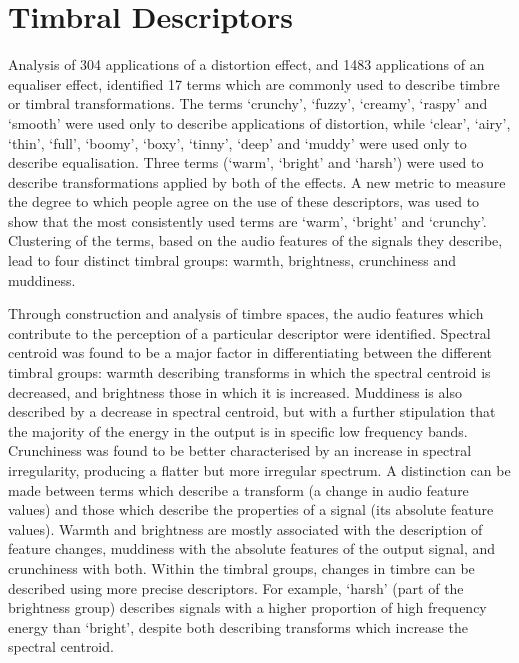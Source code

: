 \section{Timbral Descriptors}
\label{sec:Conclusion-Descriptors}
	Analysis of 304 applications of a distortion effect, and 1483 applications of an equaliser effect, identified 17
	terms which are commonly used to describe timbre or timbral transformations. The terms `crunchy', `fuzzy', `creamy',
	`raspy' and `smooth' were used only to describe applications of distortion, while `clear', `airy', `thin', `full',
	`boomy', `boxy', `tinny', `deep' and `muddy' were used only to describe equalisation. Three terms (`warm', `bright'
	and `harsh') were used to describe transformations applied by both of the effects. A new metric to measure the
	degree to which people agree on the use of these descriptors, was used to show that the most consistently used terms
	are `warm', `bright' and `crunchy'.  Clustering of the terms, based on the audio features of the signals they
	describe, lead to four distinct timbral groups: warmth, brightness, crunchiness and muddiness. 

	Through construction and analysis of timbre spaces, the audio features which contribute to the perception of a
	particular descriptor were identified. Spectral centroid was found to be a major factor in differentiating between
	the different timbral groups: warmth describing transforms in which the spectral centroid is decreased, and
	brightness those in which it is increased. Muddiness is also described by a decrease in spectral centroid, but with
	a further stipulation that the majority of the energy in the output is in specific low frequency bands. Crunchiness
	was found to be better characterised by an increase in spectral irregularity, producing a flatter but more irregular
	spectrum. A distinction can be made between terms which describe a transform (a change in audio feature values) and
	those which describe the properties of a signal (its absolute feature values). Warmth and brightness are mostly
	associated with the description of feature changes, muddiness with the absolute features of the output signal, and
	crunchiness with both. Within the timbral groups, changes in timbre can be described using more precise descriptors.
	For example, `harsh' (part of the brightness group) describes signals with a higher proportion of high frequency
	energy than `bright', despite both describing transforms which increase the spectral centroid.

